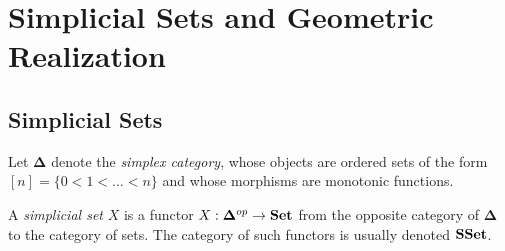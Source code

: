 \documentclass[TFM.tex]{subfiles}
\begin{document}
\chapter{Simplicial Sets and Geometric Realization}






%
%




\section{Simplicial Sets}

Let $\mathbf{\Delta}$ denote the \emph{simplex category}, whose objects are ordered sets of the form $[n]=\{0<1<\dots< n\}$ and whose morphisms are monotonic functions. 

\begin{defi}
A \emph{simplicial set} $X$ is a functor $X:\mathbf{\Delta}^{op}\to\mathrm{\mathbf{Set}}$ from the opposite category of $\mathbf{\Delta}$ to the category of sets. The category of such functors is usually denoted $\mathrm{\mathbf{SSet}}$. 
\end{defi}
\end{document}
